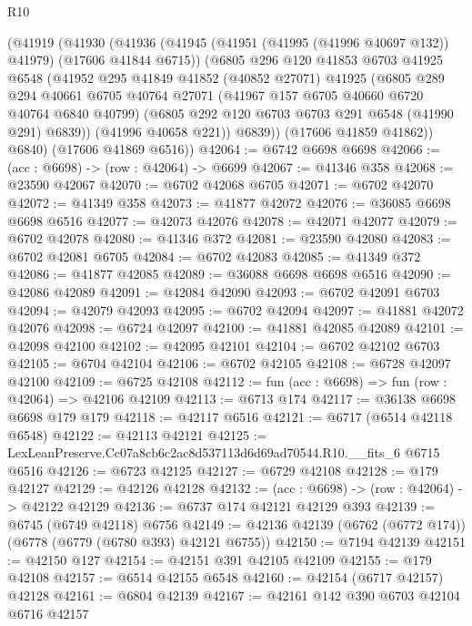 \begin{lexlean}{R10}
\begin{coremodule}
      (@41919
        (@41930
          (@41936
            (@41945 (@41951 (@41995 (@41996 @40697 @132)) @41979) (@17606 @41844 @6715))
            (@6805
              @296
              @120
              @41853
              @6703
              @41925
              @6548
              (@41952
                @295
                @41849
                @41852
                (@40852 @27071)
                @41925
                (@6805
                  @289
                  @294
                  @40661
                  @6705
                  @40764
                  @27071
                  (@41967 @157 @6705 @40660 @6720 @40764 @6840 @40799)
                  (@6805 @292 @120 @6703 @6703 @291 @6548 (@41990 @291) @6839))
                (@41996 @40658 @221))
              @6839))
          (@17606 @41859 @41862))
        @6840)
      (@17606 @41869 @6516))
@42064 := @6742 @6698 @6698
@42066 := (acc : @6698) -> (row : @42064) -> @6699
@42067 := @41346 @358
@42068 := @23590 @42067
@42070 := @6702 @42068 @6705
@42071 := @6702 @42070
@42072 := @41349 @358
@42073 := @41877 @42072
@42076 := @36085 @6698 @6698 @6516
@42077 := @42073 @42076
@42078 := @42071 @42077
@42079 := @6702 @42078
@42080 := @41346 @372
@42081 := @23590 @42080
@42083 := @6702 @42081 @6705
@42084 := @6702 @42083
@42085 := @41349 @372
@42086 := @41877 @42085
@42089 := @36088 @6698 @6698 @6516
@42090 := @42086 @42089
@42091 := @42084 @42090
@42093 := @6702 @42091 @6703
@42094 := @42079 @42093
@42095 := @6702 @42094
@42097 := @41881 @42072 @42076
@42098 := @6724 @42097
@42100 := @41881 @42085 @42089
@42101 := @42098 @42100
@42102 := @42095 @42101
@42104 := @6702 @42102 @6703
@42105 := @6704 @42104
@42106 := @6702 @42105
@42108 := @6728 @42097 @42100
@42109 := @6725 @42108
@42112 := fun (acc : @6698) => fun (row : @42064) => @42106 @42109
@42113 := @6713 @174
@42117 := @36138 @6698 @6698 @179 @179
@42118 := @42117 @6516
@42121 := @6717 (@6514 @42118 @6548)
@42122 := @42113 @42121
@42125 := LexLeanPreserve.Cc07a8cb6c2ac8d537113d6d69ad70544.R10.__fits_6 @6715 @6516
@42126 := @6723 @42125
@42127 := @6729 @42108
@42128 := @179 @42127
@42129 := @42126 @42128
@42132 := (acc : @6698) -> (row : @42064) -> @42122 @42129
@42136 := @6737 @174 @42121 @42129 @393
@42139 := @6745 (@6749 @42118) @6756
@42149 := @42136 @42139 (@6762 (@6772 @174)) (@6778 (@6779 (@6780 @393) @42121 @6755))
@42150 := @7194 @42139
@42151 := @42150 @127
@42154 := @42151 @391 @42105 @42109
@42155 := @179 @42108
@42157 := @6514 @42155 @6548
@42160 := @42154 (@6717 @42157) @42128
@42161 := @6804 @42139
@42167 := @42161 @142 @390 @6703 @42104 @6716 @42157

\end{coremodule}
\end{lexlean}
